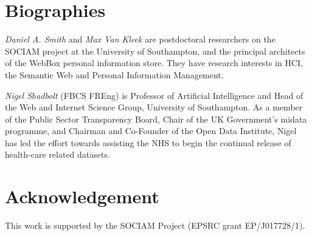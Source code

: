 \documentclass{chi-ext}
\begin{document}
\section{Biographies}

\emph{Daniel A. Smith} and \emph{Max Van Kleek} are postdoctoral researchers on the SOCIAM project at the University of Southampton, and the principal architects of the WebBox personal information store. They have research interests in HCI, the Semantic Web and Personal Information Management.

\emph{Nigel Shadbolt} (FBCS FREng) is Professor of Artificial Intelligence and Head of the Web and Internet Science Group, University of Southampton. As a member of the Public Sector Transparency Board, Chair of the UK Government's midata programme, and Chairman and Co-Founder of the Open Data Institute, Nigel has led the effort towards assisting the NHS to begin the continual release of health-care related datasets.




\section{Acknowledgement}

This work is supported by the SOCIAM Project (EPSRC grant EP/J017728/1).
\end{document}

